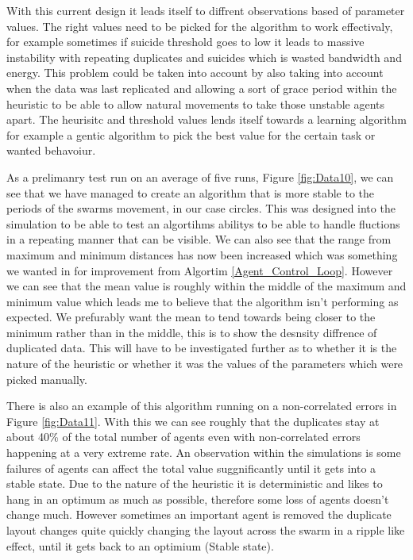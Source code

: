 \documentclass{UoYCSproject}
\begin{document}
With this current design it leads itself to diffrent observations based of parameter values.
The right values need to be picked for the algorithm to work effectivaly, for example sometimes if suicide threshold goes to low it leads to massive instability with repeating duplicates and suicides which is wasted bandwidth and energy.
This problem could be taken into account by also taking into account when the data was last replicated and allowing a sort of grace period within the heuristic to be able to allow natural movements to take those unstable agents apart.
The heurisitc and threshold values lends itself towards a learning algorithm for example a gentic algorithm to pick the best value for the certain task or wanted behavoiur.

As a prelimanry test run on an average of five runs, Figure \ref{fig:Data10}, we can see that we have managed to create an algorithm that is more stable to the periods of the swarms movement, in our case circles.
This was designed into the simulation to be able to test an algortihms abilitys to be able to handle fluctions in a repeating manner that can be visible.
We can also see that the range from maximum and minimum distances has now been increased which was something we wanted in for improvement from Algortim \ref{Agent_Control_Loop}.
However we can see that the mean value is roughly within the middle of the maximum and minimum value which leads me to believe that the algorithm isn't performing as expected.
We prefurably want the mean to tend towards being closer to the minimum rather than in the middle, this is to show the desnsity diffrence of duplicated data.
This will have to be investigated further as to whether it is the nature of the heuristic or whether it was the values of the parameters which were picked manually.

There is also an example of this algorithm running on a non-correlated errors in Figure \ref{fig:Data11}.
With this we can see roughly that the duplicates stay at about 40\% of the total number of agents even with non-correlated errors happening at a very extreme rate.
An observation within the simulations is some failures of agents can affect the total value suggnificantly until it gets into a stable state.
Due to the nature of the heuristic it is deterministic and likes to hang in an optimum as much as possible, therefore some loss of agents doesn't change much.
However sometimes an important agent is removed the duplicate layout changes quite quickly changing the layout across the swarm in a ripple like effect, until it gets back to an optimium (Stable state).
\end{document}
